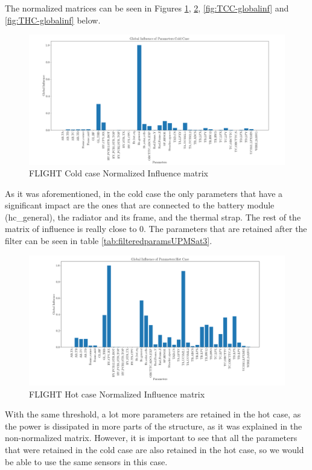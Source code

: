 The normalized matrices can be seen in Figures \ref{fig:FCC-globalinf}, \ref{fig:FHC-globalinf}, \ref{fig:TCC-globalinf} and \ref{fig:THC-globalinf} below.
\begin{figure}[H]
    \centering
    \includegraphics[width = \linewidth]{Figures/UPMSat3/Flight/Nuevas/globalinfCC.png}
    \caption{FLIGHT Cold case Normalized Influence matrix}
    \label{fig:FCC-globalinf}
\end{figure}
As it was aforementioned, in the cold case the only parameters that have a significant impact are the ones that are connected to the battery module (hc\_general), the radiator and its frame, and the thermal strap. The rest of the matrix of influence is really close to 0. The parameters that are retained after the filter can be seen in table \autoref{tab:filteredparamsUPMSat3}. 
\begin{figure}[H]
    \centering
    \includegraphics[width = \linewidth]{Figures/UPMSat3/Flight/Nuevas/globalinfHC.png}
    \caption{FLIGHT Hot case Normalized Influence matrix}
    \label{fig:FHC-globalinf}   
\end{figure}
With the same threshold, a lot more parameters are retained in the hot case, as the power is dissipated in more parts of the structure, as it was explained in the non-normalized matrix. However, it is important to see that all the parameters that were retained in the cold case are also retained in the hot case, so we would be able to use the same sensors in this case.

